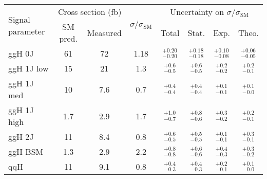 \begin{tabular}{ l | c | c | c | c | c | c | c }
\multirow{2}{*}{Signal parameter} & \multicolumn{2}{c}{Cross section (fb)}  & \multirow{2}{*}{$\sigma/\sigma_{\text{SM}}$}    & \multicolumn{4}{c}{Uncertainty on $\sigma/\sigma_{\text{SM}}$} \\
             & \multicolumn{1}{c}{SM pred.}  & \multicolumn{1}{c}{Measured} &       & Total              & Stat.              & Exp.               & Theo.               \\
\hline
ggH 0J       & 61                            & 72                           & 1.18  & $_{-0.20}^{+0.20}$ & $_{-0.18}^{+0.18}$ & $_{-0.08}^{+0.10}$ & $_{-0.05}^{+0.06}$  \\[3pt]
ggH 1J low   & 15                            & 21                           & 1.3   & $_{-0.5}^{+0.6}$   & $_{-0.5}^{+0.6}$   & $_{-0.2}^{+0.2}$   & $_{-0.1}^{+0.2}$    \\[3pt]
ggH 1J med   & 10                            & 7.6                          & 0.7   & $_{-0.4}^{+0.4}$   & $_{-0.4}^{+0.4}$   & $_{-0.1}^{+0.1}$   & $_{-0.0}^{+0.1}$    \\[3pt]
ggH 1J high  & 1.7                           & 2.9                          & 1.7   & $_{-0.7}^{+1.0}$   & $_{-0.6}^{+0.8}$   & $_{-0.2}^{+0.3}$   & $_{-0.1}^{+0.2}$    \\[3pt]
ggH 2J       & 11                            & 8.4                          & 0.8   & $_{-0.5}^{+0.6}$   & $_{-0.5}^{+0.5}$   & $_{-0.1}^{+0.1}$   & $_{-0.1}^{+0.3}$    \\[3pt]
ggH BSM      & 1.3                           & 2.9                          & 2.2   & $_{-0.8}^{+0.8}$   & $_{-0.6}^{+0.6}$   & $_{-0.3}^{+0.4}$   & $_{-0.2}^{+0.3}$    \\[3pt]
qqH          & 11                            & 9.1                          & 0.8   & $_{-0.3}^{+0.4}$   & $_{-0.3}^{+0.4}$   & $_{-0.1}^{+0.2}$   & $_{-0.0}^{+0.1}$    \\[3pt]
\end{tabular}                                                                                                            
